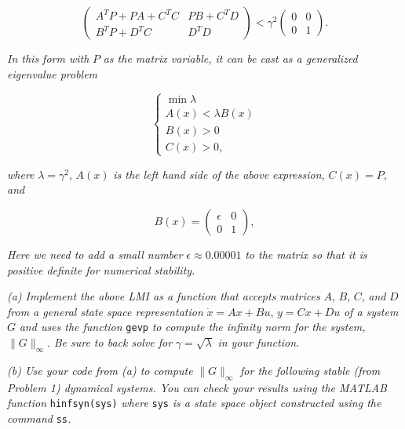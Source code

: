 \documentclass[12pt, letterpaper]{article}
\begin{document}
\[
\begin{pmatrix}
A^T P + PA + C^T C & PB + C^T D \\
B^T P + D^T C & D^T D
\end{pmatrix}
<
\gamma^2
\begin{pmatrix}
0 & 0 \\
0 & 1
\end{pmatrix}.
\]

\textit{In this form with } $P$ \textit{as the matrix variable, it can be cast as a generalized eigenvalue problem}

\[
\begin{cases}
\min \lambda \\
A(x) < \lambda B(x) \\
B(x) > 0 \\
C(x) > 0,
\end{cases}
\]

\textit{where } $\lambda = \gamma^2$, \textit{ } $A(x)$ \textit{ is the left hand side of the above expression, } $C(x) = P$, \textit{ and}

\[
B(x) = 
\begin{pmatrix}
\epsilon & 0 \\
0 & 1
\end{pmatrix},
\]

\textit{Here we need to add a small number } $\epsilon \approx 0.00001$ \textit{ to the matrix so that it is positive definite for numerical stability.}

\textit{(a) Implement the above LMI as a function that accepts matrices } $A$, $B$, $C$, \textit{ and } $D$ \textit{ from a general state space representation } $\dot{x} = Ax + Bu$, $y = Cx + Du$ \textit{ of a system } $G$ \textit{ and uses the function } \texttt{gevp} \textit{ to compute the infinity norm for the system, } $\|G\|_{\infty}$. \textit{ Be sure to back solve for } $\gamma = \sqrt{\lambda}$ \textit{ in your function.}

\textit{(b) Use your code from (a) to compute } $\|G\|_{\infty}$ \textit{ for the following stable (from Problem 1) dynamical systems. You can check your results using the MATLAB function } \texttt{hinfsyn(sys)} \textit{ where } \texttt{sys} \textit{ is a state space object constructed using the command } \texttt{ss}\textit{.}
\end{document}
